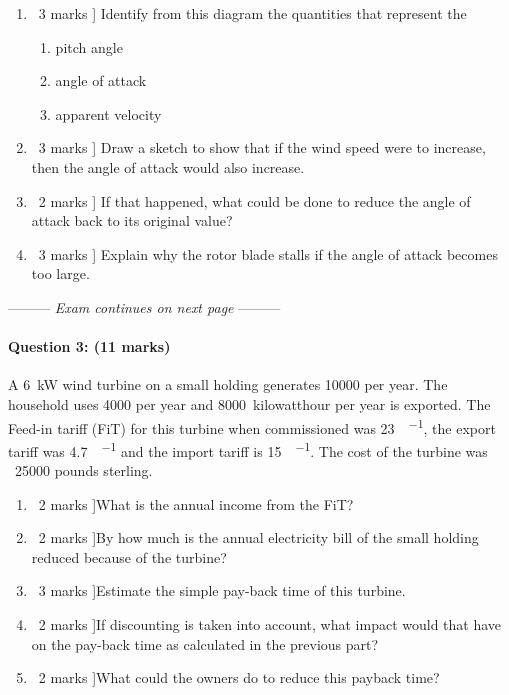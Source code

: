 \documentclass[a4paper,12pt,fleqn]{article}
\newcommand{\middlewords}{Exam continues on next page}
\begin{document}
\begin{enumerate} [label=\alph*)]
\item \lbrack\ 3 marks ] Identify from this diagram the quantities that represent the 
    \begin{enumerate} [label=\roman*)]
        \item pitch angle
        \item angle of attack
        \item apparent velocity
    \end{enumerate}
\item \lbrack\ 3 marks ] Draw a sketch to show that if the wind speed were to increase, then the angle of attack would also increase.
\item \lbrack\ 2 marks ] If that happened, what could be done to reduce the angle of attack back to its original value?
\item \lbrack\ 3 marks ] Explain why the rotor blade stalls if the angle of attack becomes too large.
\end{enumerate}

\begin{center}
\vspace{3cm}
--------- \textit{\middlewords} ---------
\end{center}

\paragraph{\textbf{Question 3: (11 marks)}}
A \SI{6}{\kilo\watt} wind turbine on a small holding generates \SI{10000}{\kilowatthour} per year. The household uses \SI{4000}{\kilowatthour}
per year and \SI{8000}{kilowatthour} per year is exported. The Feed-in tariff (FiT) for this turbine when commissioned was \SI{23}{\pence\per\kilowatthour},
the export tariff was \SI{4.7}{\pence\per\kilowatthour} and the import tariff is \SI{15}{\pence\per\kilowatthour}. 
The cost of the turbine was \SI{}{25000} pounds sterling.

\begin {enumerate} [label=\alph*)]
\item \lbrack\ 2 marks ]What is the annual income from the FiT?
\item \lbrack\ 2 marks ]By how much is the annual electricity bill of the small holding reduced because of the turbine?
\item \lbrack\ 3 marks ]Estimate the simple pay-back time of this turbine.
\item \lbrack\ 2 marks ]If discounting is taken into account, what impact would that have on the pay-back time as calculated in the previous part?
\item \lbrack\ 2 marks ]What could the owners do to reduce this payback time?
\end{enumerate}
\end{document}
